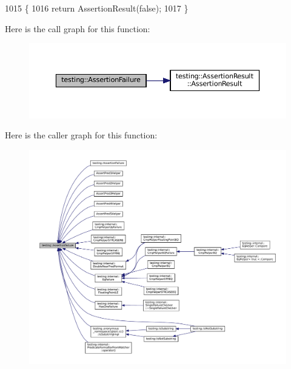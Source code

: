 \begin{DoxyCode}
1015                                    \{
1016   \textcolor{keywordflow}{return} AssertionResult(\textcolor{keyword}{false});
1017 \}
\end{DoxyCode}
Here is the call graph for this function\+:
\nopagebreak
\begin{figure}[H]
\begin{center}
\leavevmode
\includegraphics[width=350pt]{namespacetesting_a75cb789614cb1c28c34627a4a3c053df_cgraph}
\end{center}
\end{figure}
Here is the caller graph for this function\+:
\nopagebreak
\begin{figure}[H]
\begin{center}
\leavevmode
\includegraphics[width=350pt]{namespacetesting_a75cb789614cb1c28c34627a4a3c053df_icgraph}
\end{center}
\end{figure}
\mbox{\label{namespacetesting_a6bdf82adf159dcda822d75746937ffa9}} 
